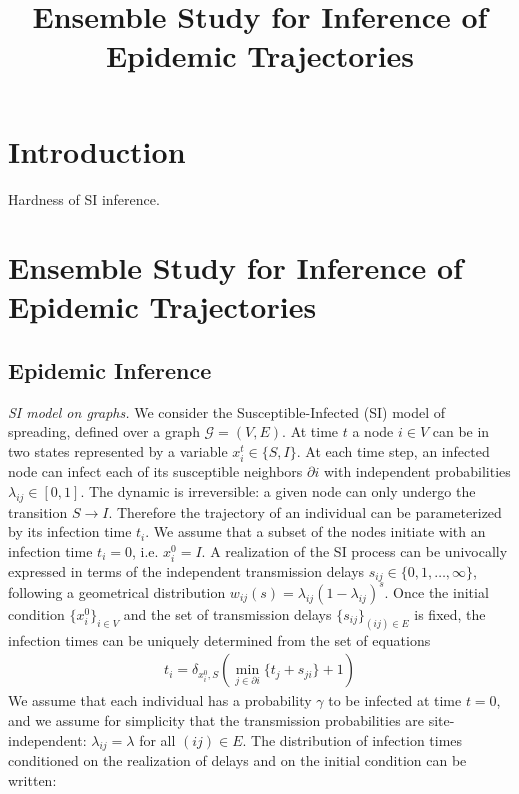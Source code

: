 \documentclass[a4paper, amsfonts, amssymb, amsmath, reprint, showkeys, nofootinbib, twoside, floatfix, pre,superscriptaddress]{revtex4-2}
\begin{document}
\title{Ensemble Study for Inference of Epidemic Trajectories}

\maketitle

\section{Introduction}

Hardness of SI inference.

\section{Ensemble Study for Inference of Epidemic Trajectories}
\subsection{Epidemic Inference}
{\it SI model on graphs.}
We consider the Susceptible-Infected (SI) model of spreading, defined over a graph $\mathcal{G}=(V,E)$.
At time $t$ a node $i\in V$ can be in two states represented by a variable $x_i^t\in\{S,I\}$.
At each time step, an infected node can infect each of its susceptible neighbors $\partial i$ with independent probabilities $\lambda_{ij}\in[0,1]$.
The dynamic is irreversible: a given node can only undergo the transition $S\to I$. 
Therefore the trajectory of an individual can be parameterized by its infection time $t_i$.
We assume that a subset of the nodes initiate with an infection time $t_i=0$, i.e. $x_i^0=I$.
A realization of the SI process can be univocally expressed in terms of the independent transmission delays $s_{ij}\in\{0, 1, \dots, \infty\}$, following a geometrical distribution $w_{ij}(s)=\lambda_{ij}(1-\lambda_{ij})^s$.
Once the initial condition $\{x_i^0\}_{i\in V}$ and the set of transmission delays $\{s_{ij}\}_{(ij)\in E}$ is fixed, the infection times can be uniquely determined from the set of equations
\begin{align}
\label{eq:equation_infected_times}
	t_i=\delta_{x_i^0,S}(\min_{j\in\partial i}\{t_j+s_{ji}\}+1)
\end{align}
We assume that each individual has a probability $\gamma$ to be infected at time $t=0$, and we assume for simplicity that the transmission probabilities are site-independent: $\lambda_{ij}=\lambda$ for all $(ij)\in E$.
The distribution of infection times conditioned on the realization of delays and on the initial condition can be written:
\end{document}
